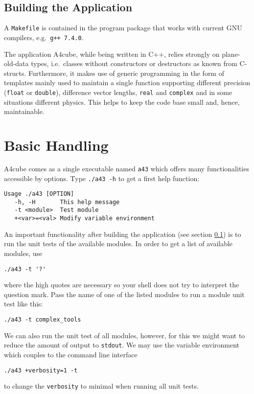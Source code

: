 \documentclass[oribibl]{llncs}
\newcommand{\ttt}[1]{\texttt{#1}}
\newcommand{\codename}{A4cube}
\begin{document}
\subsection{Building the Application} \label{sec:compiling}
A \ttt{Makefile} is contained in the program package that works with current GNU compilers, e.g.~\ttt{g++ 7.4.0}.

The application \codename{}, while being written in C++, relies strongly on plane-old-data types,
i.e.~classes without constructors or destructors as known from C-structs.
Furthermore, it makes use of generic programming in the form of templates
mainly used to maintain a single function supporting different precision (\ttt{float} or \ttt{double}), 
difference vector lengths, \ttt{real} and \ttt{complex} and in some situations different physics.
This helps to keep the code base small and, hence, maintainable.

\section{Basic Handling}
\codename{} comes as a single executable named \ttt{a43} which
offers many functionalities accessible by options. Type \ttt{./a43 -h}
to get a first help function:
\begin{verbatim}
Usage ./a43 [OPTION]
   -h, -H       This help message
   -t <module>  Test module
   +<var>=<val> Modify variable environment
\end{verbatim}

An important functionality after building the application (see section \ref{sec:compiling}) 
is to run the unit tests of the available modules.
In order to get a list of available modules, use 
\begin{verbatim}
./a43 -t '?'
\end{verbatim}
where the high quotes are necessary so your shell does not try to interpret the question mark.
Pass the name of one of the listed modules to run a module unit test like this:
\begin{verbatim}
./a43 -t complex_tools
\end{verbatim}
We can also run the unit test of all modules, however, for this we might want to reduce
the amount of output to \ttt{stdout}.
We may use the variable environment which couples to the command line interface
\begin{verbatim}
./a43 +verbosity=1 -t
\end{verbatim}
to change the \ttt{verbosity} to minimal when running all unit tests.
\end{document}
